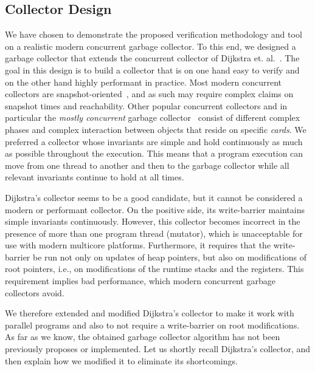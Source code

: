 \subsection{Collector Design}
We have chosen to demonstrate the proposed verification methodology and tool on a realistic modern concurrent garbage collector.
To this end, we designed a garbage collector that extends the concurrent collector of Dijkstra et. al.~\cite{dijk78}.
The goal in this design is to build a collector that is on one hand easy to verify
and on the other hand highly performant in practice.
Most modern concurrent collectors are snapshot-oriented~\cite{doli93,doli94,doma00,azat03},
and as such may require complex claims on snapshot times and reachability.
Other popular concurrent collectors and in particular the {\em mostly concurrent} garbage collector~\cite{boeh91,prin00a,bara05}
consist of different complex phases and complex interaction between objects that reside on specific {\em cards}.
We preferred a collector whose invariants are simple and hold continuously as much as possible throughout the execution.
This means that a program execution can move from one thread to another
and then to the garbage collector while all relevant invariants continue to hold at all times. 

Dijkstra's collector seems to be a good candidate,
but it cannot be considered a modern or performant collector.
On the positive side, its write-barrier maintains simple invariants continuously.
However, this collector becomes incorrect in the presence of more than one program thread (mutator),
which is unacceptable for use with modern multicore platforms.
Furthermore, it requires that the write-barrier be run not only on updates of heap pointers,
but also on modifications of root pointers, i.e., on modifications of the runtime stacks and the registers.
This requirement implies bad performance, which modern concurrent garbage collectors avoid. 

We therefore extended and modified Dijkstra's collector to make it work with parallel programs
and also to not require a write-barrier on root modifications.
As far as we know, the obtained garbage collector algorithm has not been previously proposes or implemented.
Let us shortly recall Dijkstra's collector, and then explain how we modified it to eliminate its shortcomings.  

